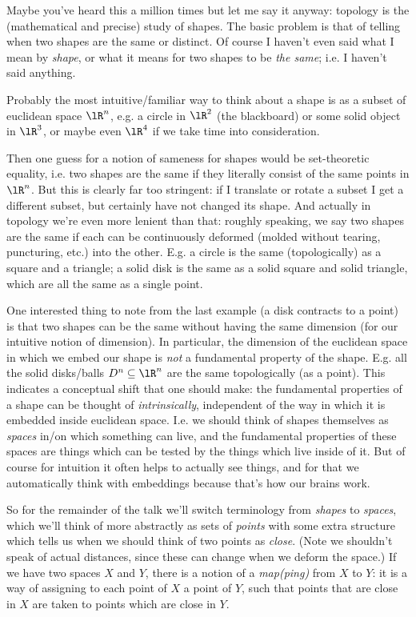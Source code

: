 \begin{nothing}[Shapes]
  Maybe you've heard this a million times but let me say it anyway:
  topology is the (mathematical and precise) study of shapes. The
  basic problem is that of telling when two shapes are the same or
  distinct. Of course I haven't even said what I mean by \emph{shape},
  or what it means for two shapes to be \emph{the same}; i.e. I
  haven't said anything.
  
  Probably the most intuitive/familiar way to think about a shape is
  as a subset of euclidean space $\lR^n$, e.g. a circle in $\lR^2$
  (the blackboard) or some solid object in $\lR^3$, or maybe even
  $\lR^4$ if we take time into consideration.

  Then one guess for a notion of sameness for shapes would be
  set-theoretic equality, i.e. two shapes are the same if they
  literally consist of the same points in $\lR^n$. But this is clearly
  far too stringent: if I translate or rotate a subset I get a
  different subset, but certainly have not changed its shape. And
  actually in topology we're even more lenient than that: roughly
  speaking, we say two shapes are the same if each can be continuously
  deformed (molded without tearing, puncturing, etc.)  into the
  other. E.g. a circle is the same (topologically) as a square and a
  triangle; a solid disk is the same as a solid square and solid
  triangle, which are all the same as a single point.
\end{nothing}

\begin{nothing}[Spaces]
  One interested thing to note from the last example (a disk contracts
  to a point) is that two shapes can be the same without having the
  same dimension (for our intuitive notion of dimension). In
  particular, the dimension of the euclidean space in which we embed
  our shape is \emph{not} a fundamental property of the
  shape. E.g. all the solid disks/balls $D^n \subseteq \lR^n$ are the
  same topologically (as a point). This indicates a conceptual shift
  that one should make: the fundamental properties of a shape can be
  thought of \emph{intrinsically}, independent of the way in which it
  is embedded inside euclidean space. I.e. we should think of shapes
  themselves as \emph{spaces} in/on which something can live, and the
  fundamental properties of these spaces are things which can be
  tested by the things which live inside of it. But of course for
  intuition it often helps to actually see things, and for that we
  automatically think with embeddings because that's how our brains
  work.

  So for the remainder of the talk we'll switch terminology from
  \emph{shapes} to \emph{spaces}, which we'll think of more abstractly
  as sets of \emph{points} with some extra structure which tells us
  when we should think of two points as \emph{close}. (Note we
  shouldn't speak of actual distances, since these can change when we
  deform the space.) If we have two spaces $X$ and $Y$, there is a
  notion of a \emph{map(ping)} from $X$ to $Y$: it is a way of
  assigning to each point of $X$ a point of $Y$, such that points that
  are close in $X$ are taken to points which are close in $Y$.
\end{nothing}

